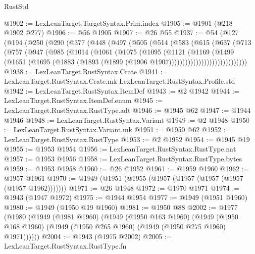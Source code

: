 \begin{lexlean}{RustStd}
\begin{coremodule}
@1902 := LexLeanTarget.TargetSyntax.Prim.index
@1905 := @1901 (@218 @1902 @277)
@1906 := @56 @1905
@1907 := @26 @55
@1937 := @54
    (@127
      (@194
        (@250
          (@290
            (@377
              (@448
                (@497
                  (@505
                    (@514
                      (@583
                        (@615
                          (@637
                            (@713
                              (@757
                                (@947
                                  (@985
                                    (@1014
                                      (@1061
                                        (@1075
                                          (@1095
                                            (@1121
                                              (@1169
                                                (@1499
                                                  (@1651
                                                    (@1695
                                                      (@1883
                                                        (@1893
                                                          (@1899
                                                            (@1906
                                                              @1907)))))))))))))))))))))))))))))
@1938 := LexLeanTarget.RustSyntax.Crate
@1941 := LexLeanTarget.RustSyntax.Crate.mk LexLeanTarget.RustSyntax.Profile.std
@1942 := LexLeanTarget.RustSyntax.ItemDef
@1943 := @2 @1942
@1944 := LexLeanTarget.RustSyntax.ItemDef.enum
@1945 := LexLeanTarget.RustSyntax.RustType.adt
@1946 := @1945 @62
@1947 := @1944 @1946
@1948 := LexLeanTarget.RustSyntax.Variant
@1949 := @2 @1948
@1950 := LexLeanTarget.RustSyntax.Variant.mk
@1951 := @1950 @62
@1952 := LexLeanTarget.RustSyntax.RustType
@1953 := @2 @1952
@1954 := @1945 @19
@1955 := @1953 @1954
@1956 := LexLeanTarget.RustSyntax.RustType.nat
@1957 := @1953 @1956
@1958 := LexLeanTarget.RustSyntax.RustType.bytes
@1959 := @1953 @1958
@1960 := @26 @1952
@1961 := @1959 @1960
@1962 := @1957 @1961
@1970 := @1949 (@1951 (@1955 (@1957 (@1957 (@1957 (@1957 (@1957 @1962)))))))
@1971 := @26 @1948
@1972 := @1970 @1971
@1974 := @1943 (@1947 @1972)
@1975 := @1944 @1954
@1977 := @1949 (@1951 @1960)
@1980 := @1949 (@1950 @19 @1960)
@1981 := @1950 @88
@2002 := @1977
    (@1980
      (@1949
        (@1981 @1960)
        (@1949
          (@1950 @163 @1960)
          (@1949 (@1950 @168 @1960) (@1949 (@1950 @265 @1960) (@1949 (@1950 @275 @1960) @1971))))))
@2004 := @1943 (@1975 @2002)
@2005 := LexLeanTarget.RustSyntax.RustType.fn

\end{coremodule}
\end{lexlean}
